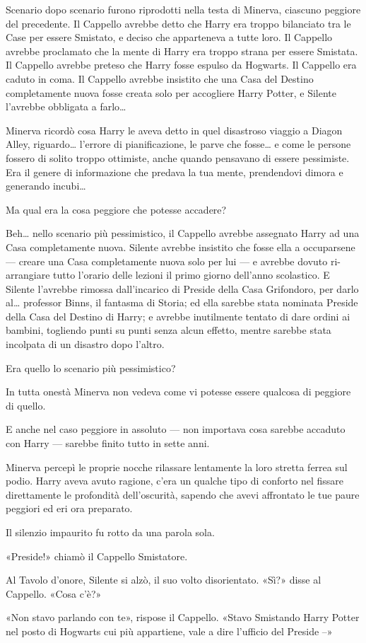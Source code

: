 Scenario dopo scenario furono riprodotti nella testa di Minerva, ciascuno peggiore del precedente. Il Cappello avrebbe detto che Harry era troppo bilanciato tra le Case per essere Smistato, e deciso che apparteneva a tutte loro. Il Cappello avrebbe proclamato che la mente di Harry era troppo strana per essere Smistata. Il Cappello avrebbe preteso che Harry fosse espulso da Hogwarts. Il Cappello era caduto in coma. Il Cappello avrebbe insistito che una Casa del Destino completamente nuova fosse creata solo per accogliere Harry Potter, e Silente l’avrebbe obbligata a farlo…

Minerva ricordò cosa Harry le aveva detto in quel disastroso viaggio a Diagon Alley, riguardo… l’errore di pianificazione, le parve che fosse… e come le persone fossero di solito troppo ottimiste, anche quando pensavano di essere pessimiste. Era il genere di informazione che predava la tua mente, prendendovi dimora e generando incubi…

Ma qual era la cosa peggiore che potesse accadere?

Beh… nello scenario più pessimistico, il Cappello avrebbe assegnato Harry ad una Casa completamente nuova. Silente avrebbe insistito che fosse ella a occuparsene — creare una Casa completamente nuova solo per lui — e avrebbe dovuto ri-arrangiare tutto l’orario delle lezioni il primo giorno dell’anno scolastico. E Silente l’avrebbe rimossa dall’incarico di Preside della Casa Grifondoro, per darlo al… professor Binns, il fantasma di Storia; ed ella sarebbe stata nominata Preside della Casa del Destino di Harry; e avrebbe inutilmente tentato di dare ordini ai bambini, togliendo punti su punti senza alcun effetto, mentre sarebbe stata incolpata di un disastro dopo l’altro.

Era quello lo scenario più pessimistico?

In tutta onestà Minerva non vedeva come vi potesse essere qualcosa di peggiore di quello.

E anche nel caso peggiore in assoluto — non importava cosa sarebbe accaduto con Harry — sarebbe finito tutto in sette anni.

Minerva percepì le proprie nocche rilassare lentamente la loro stretta ferrea sul podio. Harry aveva avuto ragione, c’era un qualche tipo di conforto nel fissare direttamente le profondità dell’oscurità, sapendo che avevi affrontato le tue paure peggiori ed eri ora preparato.

Il silenzio impaurito fu rotto da una parola sola.

«Preside!» chiamò il Cappello Smistatore.

Al Tavolo d’onore, Silente si alzò, il suo volto disorientato. «Sì?» disse al Cappello. «Cosa c’è?»

«Non stavo parlando con te», rispose il Cappello. «Stavo Smistando Harry Potter nel posto di Hogwarts cui più appartiene, vale a dire l’ufficio del Preside –»



